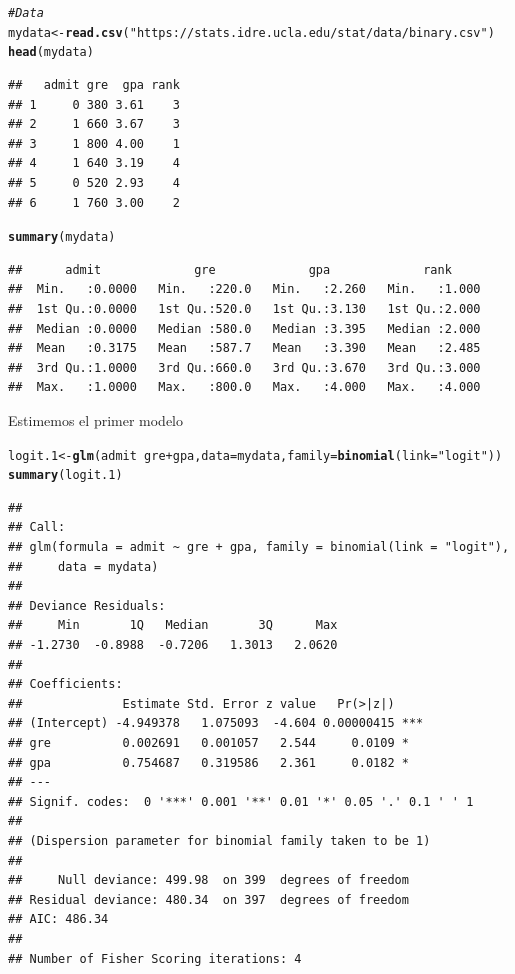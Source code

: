 \documentclass[onesided]{article}\usepackage[]{graphicx}\usepackage[]{color}
\makeatletter
\newcommand{\hlstr}[1]{\textcolor[rgb]{0.192,0.494,0.8}{#1}}%
\newcommand{\hlcom}[1]{\textcolor[rgb]{0.678,0.584,0.686}{\textit{#1}}}%
\newcommand{\hlopt}[1]{\textcolor[rgb]{0,0,0}{#1}}%
\newcommand{\hlstd}[1]{\textcolor[rgb]{0.345,0.345,0.345}{#1}}%
\newcommand{\hlkwb}[1]{\textcolor[rgb]{0.69,0.353,0.396}{#1}}%
\newcommand{\hlkwc}[1]{\textcolor[rgb]{0.333,0.667,0.333}{#1}}%
\newcommand{\hlkwd}[1]{\textcolor[rgb]{0.737,0.353,0.396}{\textbf{#1}}}%
\newenvironment{kframe}{%
 \def\at@end@of@kframe{}%
 \ifinner\ifhmode%
  \def\at@end@of@kframe{\end{minipage}}%
  \begin{minipage}{\columnwidth}%
 \fi\fi%
 \def\FrameCommand##1{\hskip\@totalleftmargin \hskip-\fboxsep
 \colorbox{shadecolor}{##1}\hskip-\fboxsep
     \hskip-\linewidth \hskip-\@totalleftmargin \hskip\columnwidth}%
 \MakeFramed {\advance\hsize-\width
   \@totalleftmargin\z@ \linewidth\hsize
   \@setminipage}}%
 {\par\unskip\endMakeFramed%
 \at@end@of@kframe}
\newenvironment{knitrout}{}{} %
\makeatother
\begin{document}
\begin{knitrout}
\color{fgcolor}\begin{kframe}
\begin{alltt}
\hlcom{# Data}
\hlstd{mydata} \hlkwb{<-} \hlkwd{read.csv}\hlstd{(}\hlstr{"https://stats.idre.ucla.edu/stat/data/binary.csv"}\hlstd{)}
\hlkwd{head}\hlstd{(mydata)}
\end{alltt}
\begin{verbatim}
##   admit gre  gpa rank
## 1     0 380 3.61    3
## 2     1 660 3.67    3
## 3     1 800 4.00    1
## 4     1 640 3.19    4
## 5     0 520 2.93    4
## 6     1 760 3.00    2
\end{verbatim}
\begin{alltt}
\hlkwd{summary}\hlstd{(mydata)}
\end{alltt}
\begin{verbatim}
##      admit             gre             gpa             rank      
##  Min.   :0.0000   Min.   :220.0   Min.   :2.260   Min.   :1.000  
##  1st Qu.:0.0000   1st Qu.:520.0   1st Qu.:3.130   1st Qu.:2.000  
##  Median :0.0000   Median :580.0   Median :3.395   Median :2.000  
##  Mean   :0.3175   Mean   :587.7   Mean   :3.390   Mean   :2.485  
##  3rd Qu.:1.0000   3rd Qu.:660.0   3rd Qu.:3.670   3rd Qu.:3.000  
##  Max.   :1.0000   Max.   :800.0   Max.   :4.000   Max.   :4.000
\end{verbatim}
\end{kframe}
\end{knitrout}

Estimemos el primer modelo

\begin{knitrout}
\color{fgcolor}\begin{kframe}
\begin{alltt}
\hlstd{logit.1} \hlkwb{<-} \hlkwd{glm}\hlstd{(admit} \hlopt{~} \hlstd{gre} \hlopt{+} \hlstd{gpa,} \hlkwc{data} \hlstd{= mydata,} \hlkwc{family} \hlstd{=} \hlkwd{binomial}\hlstd{(}\hlkwc{link} \hlstd{=} \hlstr{"logit"}\hlstd{))}
\hlkwd{summary}\hlstd{(logit.1)}
\end{alltt}
\begin{verbatim}
## 
## Call:
## glm(formula = admit ~ gre + gpa, family = binomial(link = "logit"), 
##     data = mydata)
## 
## Deviance Residuals: 
##     Min       1Q   Median       3Q      Max  
## -1.2730  -0.8988  -0.7206   1.3013   2.0620  
## 
## Coefficients:
##              Estimate Std. Error z value   Pr(>|z|)    
## (Intercept) -4.949378   1.075093  -4.604 0.00000415 ***
## gre          0.002691   0.001057   2.544     0.0109 *  
## gpa          0.754687   0.319586   2.361     0.0182 *  
## ---
## Signif. codes:  0 '***' 0.001 '**' 0.01 '*' 0.05 '.' 0.1 ' ' 1
## 
## (Dispersion parameter for binomial family taken to be 1)
## 
##     Null deviance: 499.98  on 399  degrees of freedom
## Residual deviance: 480.34  on 397  degrees of freedom
## AIC: 486.34
## 
## Number of Fisher Scoring iterations: 4
\end{verbatim}
\end{kframe}
\end{knitrout}
\end{document}

